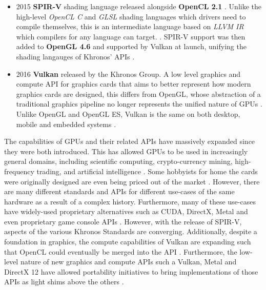 \documentclass[a4paper,12pt,twoside,openright]{report}
\begin{document}
\begin{itemize}
    \item 2015 \textbf{SPIR-V} shading language released alongside
    \textbf{OpenCL 2.1} \cite{SPIRVLaunch}. Unlike the high-level
    \textit{OpenCL C} and \textit{GLSL} shading languages which drivers need to
    compile themselves, this is an intermediate language based on \textit{LLVM
    IR} which compilers for any language can target. \cite{LLVMIR}
    \cite{SPIRV}. SPIR-V support was then added to \textbf{OpenGL 4.6} and
    supported by Vulkan at launch, unifying the shading langauges of Khronos'
    APIs \cite{SPIRVOpenGL}.

    \item 2016 \textbf{Vulkan} released by the Khronos Group. A low level
    graphics and compute API for graphics cards that aims to better represent
    how modern graphics cards are designed, this differs from OpenGL, whose
    abstraction of a traditional graphics pipeline no longer represents the
    unified nature of GPUs \cite{VulkanAnnouncement}. Unlike OpenGL and OpenGL
    ES, Vulkan is the same on both desktop, mobile and embedded systems
    \cite{Vulkan}.

\end{itemize}


The capabilities of GPUs and their related APIs have massively expanded since
they were both introduced. This has allowed GPUs to be used in increasingly
general domains, including scientific computing, crypto-currency mining,
high-frequency trading, and artificial intelligence \cite{GPUCrypto}
\cite{GPUScientificComputing} \cite{GPUTrading} \cite{GPUAI}. Some hobbyists
for home the cards were originally designed are even being priced out of the
market \cite{GPUCrypto} \cite{BitcoinRuiningPricing}. However, there are many
different standards and APIs for different use-cases of the same hardware as a
result of a complex history. Furthermore, many of these use-cases have
widely-used proprietary alternatives such as CUDA, DirectX, Metal and even
proprietary game console APIs \cite{CUDA} \cite{Metal} \cite{Direct3D}
\cite{PS4PortCrew}. However, with the release of SPIR-V, aspects of the various
Khronos Standards are converging. Additionally, despite a foundation in
graphics, the compute capabilities of Vulkan are expanding such that OpenCL
could eventually be merged into the API \cite{VulkanOpenCLMerge}. Furthermore,
the low-level nature of new graphics and compute APIs such a Vulkan, Metal and
DirectX 12 have allowed portability initiatives to bring implementations of
those APIs as light shims above the others \cite{VulkanPortabilityInitiative}
\cite{VulkanPortabilityInitiativeAnnouncement}.
\end{document}
